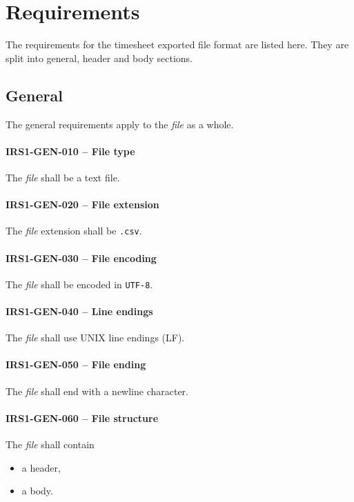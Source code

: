 \section{Requirements} \label{sec:requirements}
The requirements for the timesheet exported file format are listed here.
They are split into general, header and body sections.

\subsection{General}
The general requirements apply to the \emph{file} as a whole.

\paragraph{IRS1-GEN-010 -- File type}
The \emph{file} shall be a text file.

\paragraph{IRS1-GEN-020 -- File extension}
The \emph{file} extension shall be \lstinline{.csv}.

\paragraph{IRS1-GEN-030 -- File encoding}
The \emph{file} shall be encoded in \lstinline{UTF-8}.

\paragraph{IRS1-GEN-040 -- Line endings}
The \emph{file} shall use UNIX line endings (LF).

\paragraph{IRS1-GEN-050 -- File ending}
The \emph{file} shall end with a newline character.

\paragraph{IRS1-GEN-060 -- File structure}
The \emph{file} shall contain
\begin{itemize}
\item a header,
\item a body.
\end{itemize}

